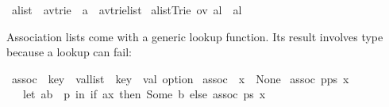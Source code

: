 \begin{isabellebody}
\isamarkupfalse%
\ alist\ {}{}\ {}{}{}a{}{}v{}trie\ {}\ {}{}a\ {}\ {}{}a{}{}v{}trie{}list{}\ \isanewline
{}alist{}Trie\ ov\ al{}\ {}\ al{}%
\begin{isamarkuptext}%
\noindent
Association lists come with a generic lookup function.  Its result
involves type  because a lookup can fail:%
\end{isamarkuptext}%
\isamarkuptrue%
\isamarkupfalse%
\ assoc\ {}{}\ {}{}{}key\ {}\ {}val{}list\ {}\ {}key\ {}\ {}val\ option{}\ \isanewline
{}assoc\ {}{}\ x\ {}\ None{}\ {}\isanewline
{}assoc\ {}p{}ps{}\ x\ {}\isanewline
\ \ \ {}let\ {}a{}b{}\ {}\ p\ in\ if\ a{}x\ then\ Some\ b\ else\ assoc\ ps\ x{}{}%

\end{isabellebody}
